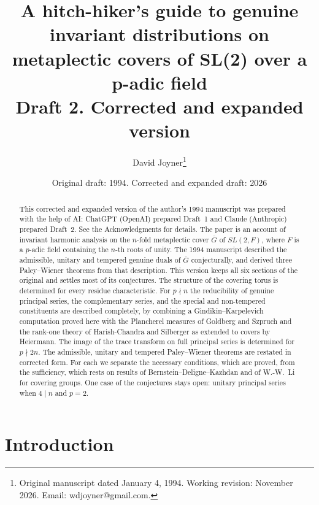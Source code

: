 \documentclass[12pt,letterpaper]{article}
\numberwithin{equation}{section}
\theoremstyle{definition}
\newcommand{\bG}{\overline{G}}
\begin{document}
\author{David Joyner\thanks{Original manuscript dated January 4, 1994. Working revision: November 2026. Email: wdjoyner@gmail.com.}}
\title{A hitch-hiker's guide to genuine invariant distributions on metaplectic
covers of SL(2) over a p-adic field\\[4pt]\large Draft 2. Corrected and expanded version}
\date{Original draft: 1994. Corrected and expanded draft: 2026}
\maketitle

\begin{abstract}
This corrected and expanded version of the author's 1994 manuscript was prepared with the
help of AI: ChatGPT (OpenAI) prepared Draft~1 and Claude (Anthropic) prepared Draft~2.
See the Acknowledgments for details.  The paper is an account of invariant harmonic
analysis on the $n$-fold metaplectic cover $\bG$ of $SL(2,F)$, where $F$ is a $p$-adic
field containing the $n$-th roots of unity.  The 1994 manuscript described the admissible,
unitary and tempered genuine duals of $\bG$ conjecturally, and derived three Paley--Wiener
theorems from that description.  This version keeps all six sections of the original and
settles most of its conjectures.  The structure of the covering torus is determined for
every residue characteristic.  For $p\nmid n$ the reducibility of genuine principal series,
the complementary series, and the special and non-tempered constituents are described
completely, by combining a Gindikin--Karpelevich computation proved here with the Plancherel
measures of Goldberg and Szpruch and the rank-one theory of Harish-Chandra and Silberger as
extended to covers by Heiermann.  The image of the trace transform on full principal series
is determined for $p\nmid 2n$.  The admissible, unitary and tempered Paley--Wiener theorems
are restated in corrected form.  For each we separate the necessary conditions, which are
proved, from the sufficiency, which rests on results of Bernstein--Deligne--Kazhdan and of
W.-W.~Li for covering groups.  One case of the conjectures stays open: unitary principal
series when $4\mid n$ and $p=2$.
\end{abstract}

\tableofcontents

\section{Introduction}\label{sec:intro}
\end{document}
